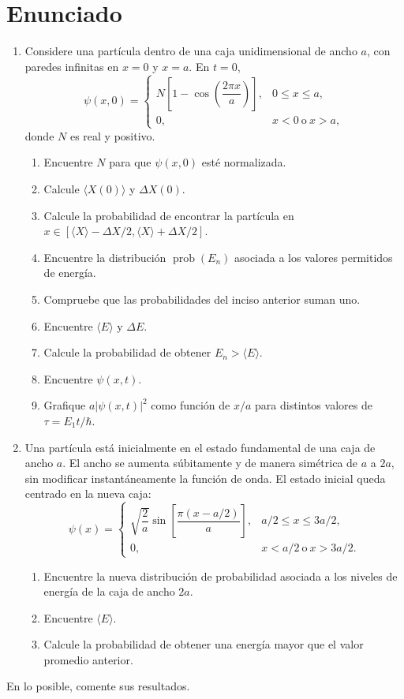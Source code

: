 \documentclass[11pt,a4paper]{article}
\numberwithin{equation}{section}
\begin{document}
\section*{Enunciado}
\begin{enumerate}[label=\arabic*.-]
\item Considere una partícula dentro de una caja unidimensional de ancho $a$, con paredes infinitas en $x=0$ y $x=a$. En $t=0$,
\begin{equation}
\psi(x,0)=\begin{cases}
N\left[1-\cos\left(\dfrac{2\pi x}{a}\right)\right],&0\le x\le a,\\
0,&x<0\ \text{o}\ x>a,
\end{cases}
\end{equation}
donde $N$ es real y positivo.
\begin{enumerate}[label=\alph*)]
\item Encuentre $N$ para que $\psi(x,0)$ esté normalizada.
\item Calcule $\langle X(0)\rangle$ y $\Delta X(0)$.
\item Calcule la probabilidad de encontrar la partícula en $x\in[\langle X\rangle-\Delta X/2,\langle X\rangle+\Delta X/2]$.
\item Encuentre la distribución $\operatorname{prob}(E_n)$ asociada a los valores permitidos de energía.
\item Compruebe que las probabilidades del inciso anterior suman uno.
\item Encuentre $\langle E\rangle$ y $\Delta E$.
\item Calcule la probabilidad de obtener $E_n>\langle E\rangle$.
\item Encuentre $\psi(x,t)$.
\item Grafique $a|\psi(x,t)|^2$ como función de $x/a$ para distintos valores de $\tau=E_1t/\hbar$.
\end{enumerate}

\item Una partícula está inicialmente en el estado fundamental de una caja de ancho $a$. El ancho se aumenta súbitamente y de manera simétrica de $a$ a $2a$, sin modificar instantáneamente la función de onda. El estado inicial queda centrado en la nueva caja:
\begin{equation}
\psi(x)=\begin{cases}
\sqrt{\dfrac{2}{a}}\sin\left[\dfrac{\pi(x-a/2)}{a}\right],&a/2\le x\le 3a/2,\\
0,&x<a/2\ \text{o}\ x>3a/2.
\end{cases}
\end{equation}
\begin{enumerate}[label=\alph*)]
\item Encuentre la nueva distribución de probabilidad asociada a los niveles de energía de la caja de ancho $2a$.
\item Encuentre $\langle E\rangle$.
\item Calcule la probabilidad de obtener una energía mayor que el valor promedio anterior.
\end{enumerate}
\end{enumerate}
En lo posible, comente sus resultados.
\end{document}
